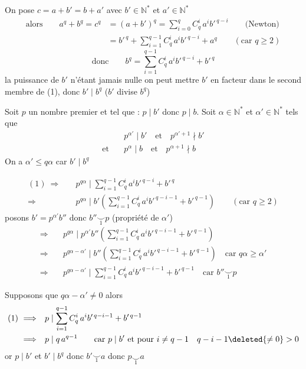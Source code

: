On pose $c=a+b'=b+a'$ avec $b'\in\mathbb N^*$ et $a'\in\mathbb N^*$
\[
\begin{aligned}
\text{alors}\qquad a^q+b^q=c^q&=(a+b')^q=\sum_{i=0}^{q}C_q^i\,a^i b'^{\,q-i}\qquad\text{(Newton)}\\
 &=b'^{\,q}+\sum_{i=1}^{q-1}C_q^i\,a^i b'^{\,q-i}+a^q\qquad(\text{car }q\geqslant2)
\end{aligned}
\]
\[
\text{donc}\qquad b^q=\sum_{i=1}^{q-1}C_q^i\,a^i b'^{\,q-i}+b'^{\,q}\tag*{(1)}
\]
la puissance de $b'$ n'étant jamais nulle on peut mettre $b'$ en facteur dans le second membre de (1), donc $b'\mid b^q$ ($b'$ divise $b^q$)

Soit $p$ un nombre premier  et tel que : $p\mid b'$ donc $p\mid b$. Soit $\alpha\in\mathbb N^*$ et $\alpha'\in\mathbb N^*$ tels que
\[
\begin{aligned}
 &p^{\alpha'}\mid b'\quad\text{et}\quad p^{\alpha'+1}\nmid b'\\
 \text{et}\quad &p^\alpha\mid b\quad\text{et}\quad p^{\alpha+1}\nmid b
\end{aligned}
\]
On a $\alpha'\leqslant q\alpha$ car $b'\mid b^q$

\[
\begin{aligned}
(1)\ \Longrightarrow\quad&p^{q\alpha}\mid\sum_{i=1}^{q-1}C_q^i\,a^i b'^{\,q-i}+b'^{\,q}\\
\Longrightarrow\quad&p^{q\alpha}\mid b'\left(\sum_{i=1}^{q-1}C_q^i\,a^i b'^{\,q-i-1}+b'^{\,q-1}\right)\qquad(\text{car }q\geqslant2)
\end{aligned}
\]
posons $b'=p^{\alpha'}b''$ donc $b''\mathrel{\underset{1}{\smile}}p$ (propriété de $\alpha'$)
\[
\begin{aligned}
\Longrightarrow\quad&p^{q\alpha}\mid p^{\alpha'}b''\left(\sum_{i=1}^{q-1}C_q^i\,a^i b'^{\,q-i-1}+b'^{\,q-1}\right)\\
\Longrightarrow\quad&p^{q\alpha-\alpha'}\mid b''\left(\sum_{i=1}^{q-1}C_q^i\,a^i b'^{\,q-i-1}+b'^{\,q-1}\right)\quad\text{car }q\alpha\geqslant\alpha'\\
\Longrightarrow\quad&p^{q\alpha-\alpha'}\mid\sum_{i=1}^{q-1}C_q^i\,a^i b'^{\,q-i-1}+b'^{\,q-1}\quad\text{car }b''\mathrel{\underset{1}{\smile}}p
\end{aligned}
\]

Supposons que $q\alpha-\alpha'\ne0$ alors
\[
\begin{aligned}
(1)\ \Longrightarrow\quad &p\mid\sum_{i=1}^{q-1}C_q^i\,a^i b'^{\,q-i-1}+b'^{\,q-1}\\
\Longrightarrow\quad &p\mid q\,a^{q-1}\qquad\text{car }p\mid b'\ \text{et pour }i\ne q-1\quad q-i-1\deleted{\ne0}>0
\end{aligned}
\]
or $p\mid b'$ et $b'\mid b^q$ donc $b'\mathrel{\underset{1}{\smile}}a$ donc $p\mathrel{\underset{1}{\smile}}a$

